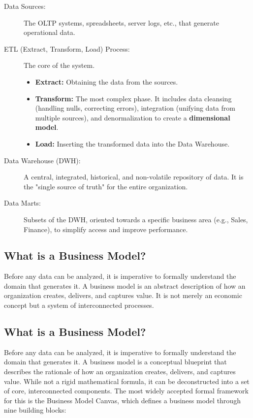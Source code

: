 \begin{description}
    \item[Data Sources:] The OLTP systems, spreadsheets, server logs, etc., that generate operational data.
    \item[ETL (Extract, Transform, Load) Process:] The core of the system.
    \begin{itemize}
        \item \textbf{Extract:} Obtaining the data from the sources.
        \item \textbf{Transform:} The most complex phase. It includes data cleansing (handling nulls, correcting errors), integration (unifying data from multiple sources), and denormalization to create a \textbf{dimensional model}.
        \item \textbf{Load:} Inserting the transformed data into the Data Warehouse.
    \end{itemize}
    \item[Data Warehouse (DWH):] A central, integrated, historical, and non-volatile repository of data. It is the "single source of truth" for the entire organization.
    \item[Data Marts:] Subsets of the DWH, oriented towards a specific business area (e.g., Sales, Finance), to simplify access and improve performance.
\end{description}

\subsection{What is a Business Model?}
Before any data can be analyzed, it is imperative to formally understand the domain that generates it. A business model is an abstract description of how an organization creates, delivers, and captures value. It is not merely an economic concept but a system of interconnected processes.

\subsection{What is a Business Model?}
Before any data can be analyzed, it is imperative to formally understand the domain that generates it. A business model is a conceptual blueprint that describes the rationale of how an organization creates, delivers, and captures value. While not a rigid mathematical formula, it can be deconstructed into a set of core, interconnected components. The most widely accepted formal framework for this is the Business Model Canvas, which defines a business model through nine building blocks:

